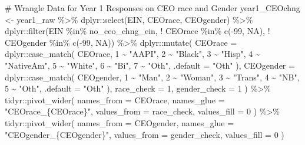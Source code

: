 \documentclass[
  letterpaper,
]{scrbook}
\newenvironment{Shaded}{\begin{snugshade}}{\end{snugshade}}
\newcommand{\AttributeTok}[1]{\textcolor[rgb]{0.40,0.45,0.13}{#1}}
\newcommand{\CommentTok}[1]{\textcolor[rgb]{0.37,0.37,0.37}{#1}}
\newcommand{\ConstantTok}[1]{\textcolor[rgb]{0.56,0.35,0.01}{#1}}
\newcommand{\DecValTok}[1]{\textcolor[rgb]{0.68,0.00,0.00}{#1}}
\newcommand{\FunctionTok}[1]{\textcolor[rgb]{0.28,0.35,0.67}{#1}}
\newcommand{\NormalTok}[1]{\textcolor[rgb]{0.00,0.23,0.31}{#1}}
\newcommand{\OtherTok}[1]{\textcolor[rgb]{0.00,0.23,0.31}{#1}}
\newcommand{\SpecialCharTok}[1]{\textcolor[rgb]{0.37,0.37,0.37}{#1}}
\newcommand{\StringTok}[1]{\textcolor[rgb]{0.13,0.47,0.30}{#1}}
\begin{document}
\begin{Shaded}
\begin{Highlighting}[]
\CommentTok{\# Wrangle Data for Year 1 Responses on CEO race and Gender}
\NormalTok{year1\_CEOchng }\OtherTok{\textless{}{-}}\NormalTok{ year1\_raw }\SpecialCharTok{\%\textgreater{}\%} 
\NormalTok{  dplyr}\SpecialCharTok{::}\FunctionTok{select}\NormalTok{(EIN, CEOrace, CEOgender) }\SpecialCharTok{\%\textgreater{}\%} 
\NormalTok{  dplyr}\SpecialCharTok{::}\FunctionTok{filter}\NormalTok{(EIN }\SpecialCharTok{\%in\%}\NormalTok{ no\_ceo\_chng\_ein,}
                \SpecialCharTok{!}\NormalTok{ CEOrace }\SpecialCharTok{\%in\%} \FunctionTok{c}\NormalTok{(}\SpecialCharTok{{-}}\DecValTok{99}\NormalTok{, }\ConstantTok{NA}\NormalTok{),}
                \SpecialCharTok{!}\NormalTok{ CEOgender }\SpecialCharTok{\%in\%} \FunctionTok{c}\NormalTok{(}\SpecialCharTok{{-}}\DecValTok{99}\NormalTok{, }\ConstantTok{NA}\NormalTok{)) }\SpecialCharTok{\%\textgreater{}\%} 
\NormalTok{  dplyr}\SpecialCharTok{::}\FunctionTok{mutate}\NormalTok{(}
    \AttributeTok{CEOrace =}\NormalTok{ dplyr}\SpecialCharTok{::}\FunctionTok{case\_match}\NormalTok{(}
\NormalTok{      CEOrace,}
      \DecValTok{1} \SpecialCharTok{\textasciitilde{}} \StringTok{"AAPI"}\NormalTok{, }\DecValTok{2} \SpecialCharTok{\textasciitilde{}} \StringTok{"Black"}\NormalTok{, }\DecValTok{3} \SpecialCharTok{\textasciitilde{}} \StringTok{"Hisp"}\NormalTok{, }\DecValTok{4} \SpecialCharTok{\textasciitilde{}} \StringTok{"NativeAm"}\NormalTok{, }\DecValTok{5} \SpecialCharTok{\textasciitilde{}} \StringTok{"White"}\NormalTok{, }\DecValTok{6} \SpecialCharTok{\textasciitilde{}} \StringTok{"Bi"}\NormalTok{, }\DecValTok{7} \SpecialCharTok{\textasciitilde{}} \StringTok{"Oth"}\NormalTok{,}
      \AttributeTok{.default =} \StringTok{"Oth"}
\NormalTok{    ),}
    \AttributeTok{CEOgender =}\NormalTok{ dplyr}\SpecialCharTok{::}\FunctionTok{case\_match}\NormalTok{(}
\NormalTok{      CEOgender,}
      \DecValTok{1} \SpecialCharTok{\textasciitilde{}} \StringTok{"Man"}\NormalTok{, }\DecValTok{2} \SpecialCharTok{\textasciitilde{}} \StringTok{"Woman"}\NormalTok{, }\DecValTok{3} \SpecialCharTok{\textasciitilde{}} \StringTok{"Trans"}\NormalTok{, }\DecValTok{4} \SpecialCharTok{\textasciitilde{}} \StringTok{"NB"}\NormalTok{, }\DecValTok{5} \SpecialCharTok{\textasciitilde{}} \StringTok{"Oth"}\NormalTok{,}
      \AttributeTok{.default =} \StringTok{"Oth"}
\NormalTok{    ),}
  \AttributeTok{race\_check =} \DecValTok{1}\NormalTok{,}
  \AttributeTok{gender\_check =} \DecValTok{1}
\NormalTok{  ) }\SpecialCharTok{\%\textgreater{}\%} 
\NormalTok{  tidyr}\SpecialCharTok{::}\FunctionTok{pivot\_wider}\NormalTok{(}
    \AttributeTok{names\_from =}\NormalTok{ CEOrace,}
    \AttributeTok{names\_glue =} \StringTok{"CEOrace\_\{CEOrace\}"}\NormalTok{,}
    \AttributeTok{values\_from =}\NormalTok{ race\_check, }
    \AttributeTok{values\_fill =} \DecValTok{0}
\NormalTok{  ) }\SpecialCharTok{\%\textgreater{}\%} 
\NormalTok{  tidyr}\SpecialCharTok{::}\FunctionTok{pivot\_wider}\NormalTok{(}
    \AttributeTok{names\_from =}\NormalTok{ CEOgender,}
    \AttributeTok{names\_glue =} \StringTok{"CEOgender\_\{CEOgender\}"}\NormalTok{,}
    \AttributeTok{values\_from =}\NormalTok{ gender\_check, }
    \AttributeTok{values\_fill =} \DecValTok{0}
\NormalTok{  )}


\end{Highlighting}
\end{Shaded}
\end{document}
